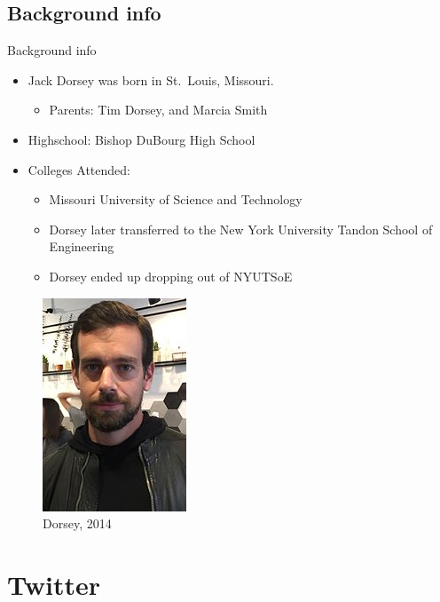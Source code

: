 \documentclass[xcolor=svgnames,handout]{beamer}
\begin{document}
\subsection{Background info}
\begin{frame}{Background info}
\begin{itemize}
    \item Jack Dorsey was born in St.\ Louis, Missouri.~\cite{timleonard2009}~\cite{lisabrown2010}
    \begin{itemize}
        \item{Parents:} Tim Dorsey, and Marcia Smith~\cite{markglaser2007}~\cite{porandrewchernin2009}~\cite{timbarker2009}
        \end{itemize}
        \item{Highschool:} Bishop DuBourg High School~\cite{markglaser2007}
        \item{Colleges Attended:}
        \begin{itemize}
            \item Missouri University of Science and Technology~\cite{unkown2009}
            \item Dorsey later transferred to the New York University Tandon School of Engineering~\cite{unkown2009}
            \item Dorsey ended up dropping out of NYUTSoE~\cite{unkown2009}
        \end{itemize}
    \end{itemize}
	\begin{figure}[h]
		\centering
		\includegraphics[scale=0.25]{Dorsey.jpg}
		\caption{Dorsey, 2014~\cite{cellanr2014}}
	\end{figure}
\end{frame}

\section{Twitter}
\end{document}
